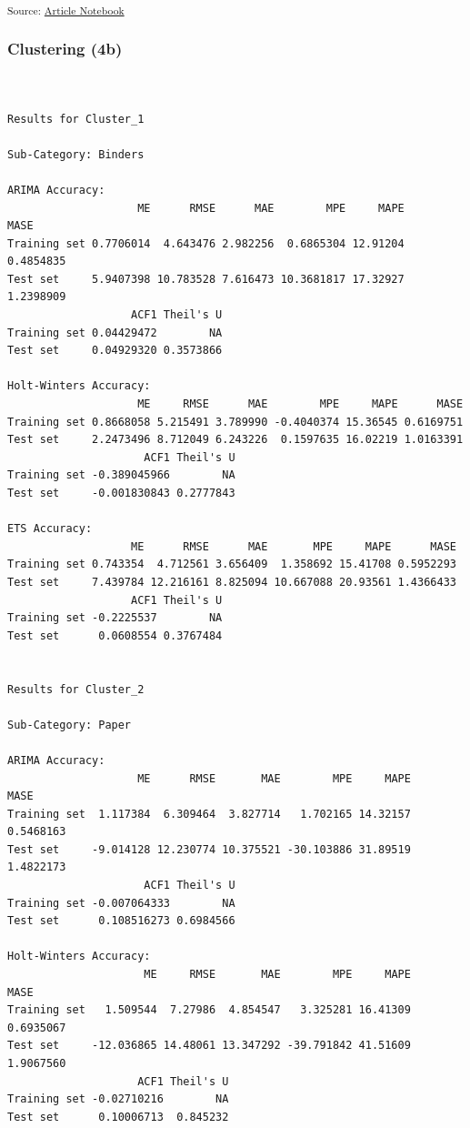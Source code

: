 \documentclass[
  letterpaper,
  DIV=11,
  numbers=noendperiod,
  oneside]{scrartcl}
\begin{document}
\textsubscript{Source:
\href{https://SJbrou.github.io/Supply_Chain_Data_Analysis/index.qmd.html}{Article
Notebook}}

\subsubsection{Clustering (4b)}\label{clustering-4b}

\begin{verbatim}


Results for Cluster_1 

Sub-Category: Binders 

ARIMA Accuracy:
                    ME      RMSE      MAE        MPE     MAPE      MASE
Training set 0.7706014  4.643476 2.982256  0.6865304 12.91204 0.4854835
Test set     5.9407398 10.783528 7.616473 10.3681817 17.32927 1.2398909
                   ACF1 Theil's U
Training set 0.04429472        NA
Test set     0.04929320 0.3573866

Holt-Winters Accuracy:
                    ME     RMSE      MAE        MPE     MAPE      MASE
Training set 0.8668058 5.215491 3.789990 -0.4040374 15.36545 0.6169751
Test set     2.2473496 8.712049 6.243226  0.1597635 16.02219 1.0163391
                     ACF1 Theil's U
Training set -0.389045966        NA
Test set     -0.001830843 0.2777843

ETS Accuracy:
                   ME      RMSE      MAE       MPE     MAPE      MASE
Training set 0.743354  4.712561 3.656409  1.358692 15.41708 0.5952293
Test set     7.439784 12.216161 8.825094 10.667088 20.93561 1.4366433
                   ACF1 Theil's U
Training set -0.2225537        NA
Test set      0.0608554 0.3767484


Results for Cluster_2 

Sub-Category: Paper 

ARIMA Accuracy:
                    ME      RMSE       MAE        MPE     MAPE      MASE
Training set  1.117384  6.309464  3.827714   1.702165 14.32157 0.5468163
Test set     -9.014128 12.230774 10.375521 -30.103886 31.89519 1.4822173
                     ACF1 Theil's U
Training set -0.007064333        NA
Test set      0.108516273 0.6984566

Holt-Winters Accuracy:
                     ME     RMSE       MAE        MPE     MAPE      MASE
Training set   1.509544  7.27986  4.854547   3.325281 16.41309 0.6935067
Test set     -12.036865 14.48061 13.347292 -39.791842 41.51609 1.9067560
                    ACF1 Theil's U
Training set -0.02710216        NA
Test set      0.10006713  0.845232


\end{verbatim}
\end{document}
